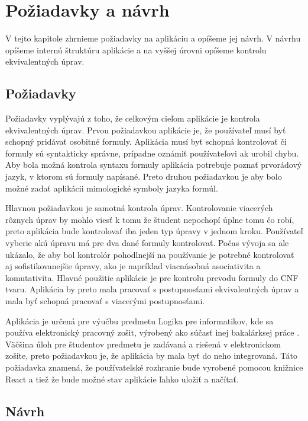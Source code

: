 \chapter{Požiadavky a návrh}

V tejto kapitole zhrnieme požiadavky na aplikáciu a opíšeme jej návrh. V návrhu opíšeme internú štruktúru aplikácie a na vyššej úrovni opíšeme kontrolu ekvivalentných úprav.

\section{Požiadavky}

Požiadavky vyplývajú z toho, že celkovým cieľom aplikácie je kontrola ekvivalentných úprav.
Prvou požiadavkou aplikácie je, že používateľ musí byť schopný pridávať osobitné formuly. Aplikácia musí byť schopná kontrolovať či formuly sú syntakticky správne, prípadne oznámiť používateľovi ak urobil chybu. Aby bola možná kontrola syntaxu formuly aplikácia potrebuje poznať prvorádový jazyk, v ktorom sú formuly napísané. Preto druhou požiadavkou je aby bolo možné zadať aplikácii mimologické symboly jazyka formúl.

Hlavnou požiadavkou je samotná kontrola úprav. Kontrolovanie viacerých rôznych úprav by mohlo viesť k tomu že študent nepochopí úplne tomu čo robí, preto aplikácia bude kontrolovať iba jeden typ úpravy v jednom kroku. Používateľ vyberie akú úpravu má pre dva dané formuly kontrolovať. Počas vývoja sa ale ukázalo, že aby bol kontrolór pohodlnejší na používanie je potrebné kontrolovať aj sofistikovanejšie úpravy, ako je napríklad viacnásobná asociativita a komutativita. Hlavné použitie aplikácie je pre kontrolu prevodu formuly do CNF tvaru. Aplikácia by preto mala pracovať s postupnosťami ekvivalentných úprav a mala byť schopná pracovať s viacerými postupnosťami.

Aplikácia je určená pre výučbu predmetu Logika pre informatikov, kde sa používa elektronický pracovný zošit, výrobený ako súčasť inej bakalárksej práce \cite{logicworkbook}. Väčšina úloh pre študentov predmetu je zadávaná a riešená v elektronickom zošite, preto požiadavkou je, že aplikácia by mala byť do neho integrovaná. Táto požiadavka znamená, že používateľské rozhranie bude vyrobené pomocou knižnice React a tiež že bude možné stav aplikácie ľahko uložiť a načítať.


\section{Návrh}

